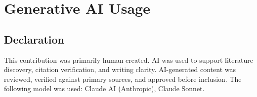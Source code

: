 \section*{Generative AI Usage}

\subsection*{Declaration}

This contribution was primarily human-created. AI was used to support literature discovery, citation verification, and writing clarity. AI-generated content was reviewed, verified against primary sources, and approved before inclusion. The following model was used: Claude AI (Anthropic), Claude Sonnet.

